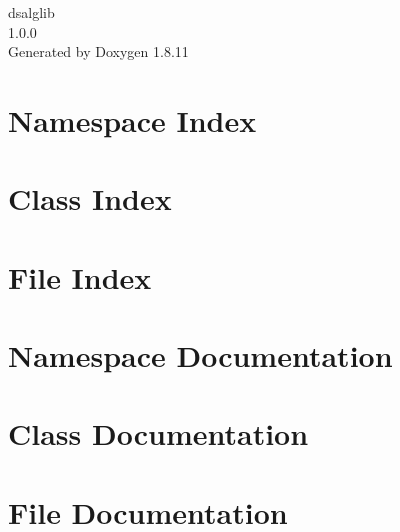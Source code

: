 \documentclass[twoside]{book}
\newcommand{\+}{\discretionary{\mbox{\scriptsize$\hookleftarrow$}}{}{}}
\newcommand{\clearemptydoublepage}{%
  \newpage{\pagestyle{empty}\cleardoublepage}%
}
\begin{document}
\hypersetup{pageanchor=false,
             bookmarksnumbered=true,
             pdfencoding=unicode
            }
\begin{titlepage}
\vspace*{7cm}
\begin{center}%
{\Large dsalglib \\[1ex]\large 1.\+0.\+0 }\\
\vspace*{1cm}
{\large Generated by Doxygen 1.8.11}\\
\end{center}
\end{titlepage}
\clearemptydoublepage
\tableofcontents
\clearemptydoublepage
{}
\hypersetup{pageanchor=true}

\chapter{Namespace Index}

\chapter{Class Index}

\chapter{File Index}

\chapter{Namespace Documentation}

\chapter{Class Documentation}










\chapter{File Documentation}





























\backmatter
\newpage
{}
\clearemptydoublepage
{}
\printindex
\end{document}
